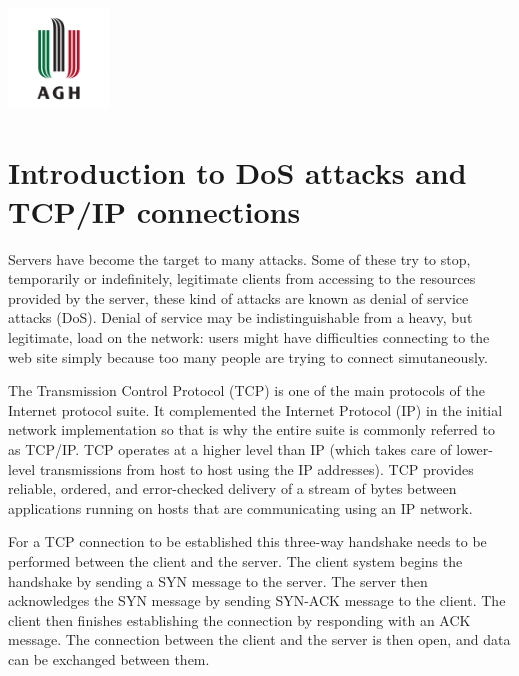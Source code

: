 \documentclass[11pt]{article}
\begin{document}
\begin{titlepage}
	\vfill\vfill
	\includegraphics[width=0.2\textwidth]{agh-logo.png}\\[1cm] %
	 
	
	\vfill %
	
\end{titlepage}


\tableofcontents
\clearpage


\section{Introduction to DoS attacks and TCP/IP connections}\index{}
Servers have become the target to many attacks. Some of these try to stop, temporarily or indefinitely, legitimate clients from accessing to the resources provided by the server, these kind of attacks are known as denial of service attacks (DoS). Denial of service may be indistinguishable from a heavy, but legitimate, load on the network: users might have difficulties connecting to the web site simply because too many people are trying to connect simutaneously.\vspace{5mm}

The Transmission Control Protocol (TCP) is one of the main protocols of the Internet protocol suite. It complemented the Internet Protocol (IP) in the initial network implementation so that is why the entire suite is commonly referred to as TCP/IP. TCP operates at a higher level than IP (which takes care of lower-level transmissions from host to host using the IP addresses). TCP provides reliable, ordered, and error-checked delivery of a stream of bytes between applications running on hosts that are communicating using an IP network.\vspace{5mm}

For a TCP connection to be established this three-way handshake needs to be performed between the client and the server. The client system begins the handshake by sending a SYN message to the server. The server then acknowledges the SYN message by sending SYN-ACK message to the client. The client then finishes establishing the connection by responding with an ACK message. The connection between the client and the server is then open, and data can be exchanged between them.\vspace{5mm}
\end{document}
